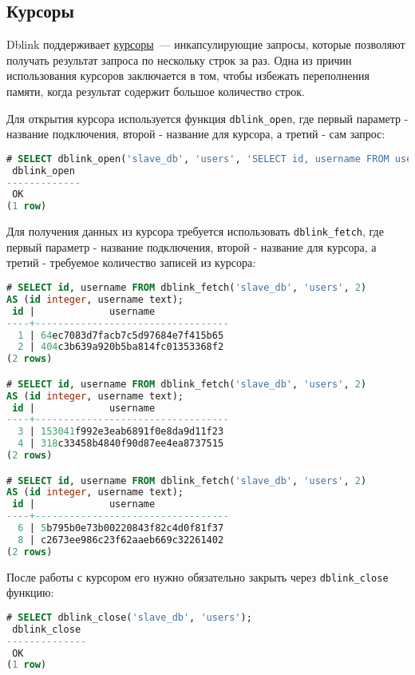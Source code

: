 \subsection{Курсоры}

Dblink поддерживает \href{https://www.postgresql.org/docs/current/static/plpgsql-cursors.html}{курсоры}~--- инкапсулирующие запросы, которые позволяют получать результат запроса по нескольку строк за раз. Одна из причин использования курсоров заключается в том, чтобы избежать переполнения памяти, когда результат содержит большое количество строк.

Для открытия курсора используется функция \lstinline!dblink_open!, где первый параметр - название подключения, второй - название для курсора, а третий - сам запрос:

\begin{lstlisting}[language=SQL,label=lst:dblink4,caption=dblink\_open]
# SELECT dblink_open('slave_db', 'users', 'SELECT id, username FROM users');
 dblink_open
-------------
 OK
(1 row)
\end{lstlisting}

Для получения данных из курсора требуется использовать \lstinline!dblink_fetch!, где первый параметр - название подключения, второй - название для курсора, а третий - требуемое количество записей из курсора:

\begin{lstlisting}[language=SQL,label=lst:dblink5,caption=dblink\_fetch]
# SELECT id, username FROM dblink_fetch('slave_db', 'users', 2)
AS (id integer, username text);
 id |             username
----+----------------------------------
  1 | 64ec7083d7facb7c5d97684e7f415b65
  2 | 404c3b639a920b5ba814fc01353368f2
(2 rows)

# SELECT id, username FROM dblink_fetch('slave_db', 'users', 2)
AS (id integer, username text);
 id |             username
----+----------------------------------
  3 | 153041f992e3eab6891f0e8da9d11f23
  4 | 318c33458b4840f90d87ee4ea8737515
(2 rows)

# SELECT id, username FROM dblink_fetch('slave_db', 'users', 2)
AS (id integer, username text);
 id |             username
----+----------------------------------
  6 | 5b795b0e73b00220843f82c4d0f81f37
  8 | c2673ee986c23f62aaeb669c32261402
(2 rows)
\end{lstlisting}

После работы с курсором его нужно обязательно закрыть через \lstinline!dblink_close! функцию:

\begin{lstlisting}[language=SQL,label=lst:dblink6,caption=dblink\_close]
# SELECT dblink_close('slave_db', 'users');
 dblink_close
--------------
 OK
(1 row)
\end{lstlisting}



